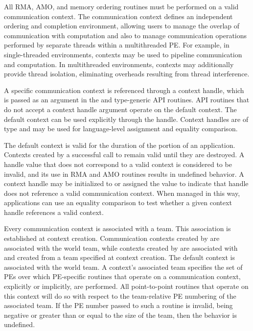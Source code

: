 All \openshmem \ac{RMA}, \ac{AMO}, and memory ordering routines must be
performed on a valid communication context.  The communication context defines an
independent ordering and completion environment, allowing users to manage the
overlap of communication with computation and also to manage communication
operations performed by separate threads within a multithreaded \ac{PE}.  For
example, in single-threaded environments, contexts may be used to pipeline
communication and computation.  In multithreaded environments, contexts may
additionally provide thread isolation, eliminating overheads resulting from
thread interference.

A specific communication context is referenced through a context handle, which is
passed as an argument in the  and type-generic \ac{API}
routines.  \ac{API} routines that do not accept a context handle argument operate on the
default context.  The default context can be used explicitly through the
 handle.
Context handles are of type  and may be used for
language-level assignment and equality comparison.

The default context is valid for the duration of the \openshmem portion of
an application.
Contexts created by a successful call to  remain
valid until they are destroyed.
A handle value that does not correspond to a valid context is considered
to be invalid, and its use in \ac{RMA} and \ac{AMO} routines results in
undefined behavior.
A context handle may be initialized to or assigned the value
 to indicate that handle does not reference a
valid communication context.
When managed in this way, applications can use an equality comparison
to test whether a given context handle references a valid context.

Every communication context is associated with a team.
This association is established at context creation.
Communication contexts created by  are
associated with the world team, while contexts created by
 are associated with and created from a team
specified at context creation.
The default context is associated with the world team.
A context's associated team specifies the set of \acp{PE} over which
\ac{PE}-specific routines that operate on a communication context,
explicitly or implicitly, are performed.
All point-to-point routines that operate on this context will do so with
respect to the team-relative \ac{PE} numbering of the associated team.
If the PE number passed to such a routine is invalid, being negative or greater
than or equal to the size of the \openshmem team, then the behavior is undefined.

